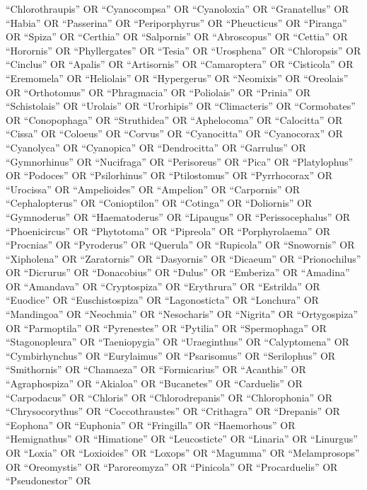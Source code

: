 \documentclass[
  number,
  review,
  onecolumn]{elsarticle}
\begin{document}
``Chlorothraupis'' OR ``Cyanocompsa'' OR ``Cyanoloxia'' OR
``Granatellus'' OR ``Habia'' OR ``Passerina'' OR ``Periporphyrus'' OR
``Pheucticus'' OR ``Piranga'' OR ``Spiza'' OR ``Certhia'' OR
``Salpornis'' OR ``Abroscopus'' OR ``Cettia'' OR ``Horornis'' OR
``Phyllergates'' OR ``Tesia'' OR ``Urosphena'' OR ``Chloropsis'' OR
``Cinclus'' OR ``Apalis'' OR ``Artisornis'' OR ``Camaroptera'' OR
``Cisticola'' OR ``Eremomela'' OR ``Heliolais'' OR ``Hypergerus'' OR
``Neomixis'' OR ``Oreolais'' OR ``Orthotomus'' OR ``Phragmacia'' OR
``Poliolais'' OR ``Prinia'' OR ``Schistolais'' OR ``Urolais'' OR
``Urorhipis'' OR ``Climacteris'' OR ``Cormobates'' OR ``Conopophaga'' OR
``Struthidea'' OR ``Aphelocoma'' OR ``Calocitta'' OR ``Cissa'' OR
``Coloeus'' OR ``Corvus'' OR ``Cyanocitta'' OR ``Cyanocorax'' OR
``Cyanolyca'' OR ``Cyanopica'' OR ``Dendrocitta'' OR ``Garrulus'' OR
``Gymnorhinus'' OR ``Nucifraga'' OR ``Perisoreus'' OR ``Pica'' OR
``Platylophus'' OR ``Podoces'' OR ``Psilorhinus'' OR ``Ptilostomus'' OR
``Pyrrhocorax'' OR ``Urocissa'' OR ``Ampelioides'' OR ``Ampelion'' OR
``Carpornis'' OR ``Cephalopterus'' OR ``Conioptilon'' OR ``Cotinga'' OR
``Doliornis'' OR ``Gymnoderus'' OR ``Haematoderus'' OR ``Lipaugus'' OR
``Perissocephalus'' OR ``Phoenicircus'' OR ``Phytotoma'' OR ``Pipreola''
OR ``Porphyrolaema'' OR ``Procnias'' OR ``Pyroderus'' OR ``Querula'' OR
``Rupicola'' OR ``Snowornis'' OR ``Xipholena'' OR ``Zaratornis'' OR
``Dasyornis'' OR ``Dicaeum'' OR ``Prionochilus'' OR ``Dicrurus'' OR
``Donacobius'' OR ``Dulus'' OR ``Emberiza'' OR ``Amadina'' OR
``Amandava'' OR ``Cryptospiza'' OR ``Erythrura'' OR ``Estrilda'' OR
``Euodice'' OR ``Euschistospiza'' OR ``Lagonosticta'' OR ``Lonchura'' OR
``Mandingoa'' OR ``Neochmia'' OR ``Nesocharis'' OR ``Nigrita'' OR
``Ortygospiza'' OR ``Parmoptila'' OR ``Pyrenestes'' OR ``Pytilia'' OR
``Spermophaga'' OR ``Stagonopleura'' OR ``Taeniopygia'' OR
``Uraeginthus'' OR ``Calyptomena'' OR ``Cymbirhynchus'' OR
``Eurylaimus'' OR ``Psarisomus'' OR ``Serilophus'' OR ``Smithornis'' OR
``Chamaeza'' OR ``Formicarius'' OR ``Acanthis'' OR ``Agraphospiza'' OR
``Akialoa'' OR ``Bucanetes'' OR ``Carduelis'' OR ``Carpodacus'' OR
``Chloris'' OR ``Chlorodrepanis'' OR ``Chlorophonia'' OR
``Chrysocorythus'' OR ``Coccothraustes'' OR ``Crithagra'' OR
``Drepanis'' OR ``Eophona'' OR ``Euphonia'' OR ``Fringilla'' OR
``Haemorhous'' OR ``Hemignathus'' OR ``Himatione'' OR ``Leucosticte'' OR
``Linaria'' OR ``Linurgus'' OR ``Loxia'' OR ``Loxioides'' OR ``Loxops''
OR ``Magumma'' OR ``Melamprosops'' OR ``Oreomystis'' OR ``Paroreomyza''
OR ``Pinicola'' OR ``Procarduelis'' OR ``Pseudonestor'' OR
\end{document}
